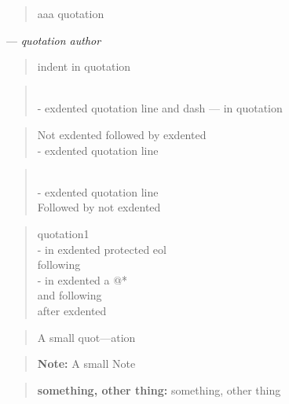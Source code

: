 \documentclass{book}
\begin{document}
\begin{titlepage}
\begin{quote}
aaa quotation
\end{quote}
\begin{center}
--- \emph{quotation author}
\end{center}

\begin{quote}
indent in quotation
\end{quote}

\begin{quote}
\\
\hbox{\kern -\leftmargin}%
exdented quotation line   and dash --- in quotation
\\
\end{quote}

\begin{quote}
Not exdented followed by exdented
\\
\hbox{\kern -\leftmargin}%
exdented quotation line
\\
\end{quote}

\begin{quote}
\\
\hbox{\kern -\leftmargin}%
exdented quotation line
\\
Followed by not exdented 
\end{quote}

\begin{quote}
quotation1
\\
\hbox{\kern -\leftmargin}%
in exdented protected eol \ {}
\\
following
\\
\hbox{\kern -\leftmargin}%
in exdented a @* \leavevmode{}\\ and following
\\
after exdented
\end{quote}

\begin{quote}
\begin{footnotesize}
A small quot---ation
\end{footnotesize}
\end{quote}

\begin{quote}
\begin{footnotesize}
\textbf{Note:} A small Note
\end{footnotesize}
\end{quote}

\begin{quote}
\begin{footnotesize}
\textbf{something, other thing:} something, other thing
\end{footnotesize}
\end{quote}


\end{titlepage}
\end{document}
